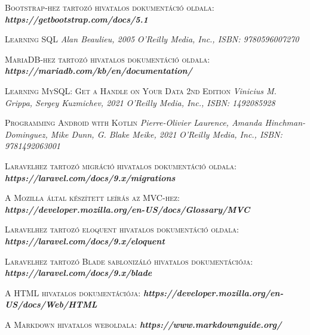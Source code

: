 \documentclass[
]{thesis-ekf}
\theoremstyle{definition}
\theoremstyle{remark}
\begin{document}
\begin{thebibliography}{2}
		\textsc{Bootstrap-hez tartozó hivatalos dokumentáció oldala:}
		\newline
		\emph{\bf{https://getbootstrap.com/docs/5.1}}
		
		\textsc{Learning SQL}
		\newline
		\emph{Alan Beaulieu, 2005}
		\emph{O'Reilly Media, Inc., ISBN: 9780596007270}
		
		\textsc{MariaDB-hez tartozó hivatalos dokumentáció oldala:}
		\newline
		\emph{\bf{https://mariadb.com/kb/en/documentation/}}
		
		\textsc{Learning MySQL: Get a Handle on Your Data 2nd Edition}
		\newline
		\emph{Vinicius M. Grippa, Sergey Kuzmichev,  2021}
		\emph{O'Reilly Media, Inc., ISBN: 1492085928}
		
		\textsc{Programming Android with Kotlin}
		\newline
		\emph{Pierre-Olivier Laurence, Amanda Hinchman-Dominguez, Mike Dunn, G. Blake Meike,  2021}
		\emph{O'Reilly Media, Inc., ISBN: 9781492063001}
		
		\textsc{Laravelhez tartozó migráció hivatalos dokumentáció oldala:}
		\newline
		\emph{\bf{https://laravel.com/docs/9.x/migrations}}
		
		\textsc{A Mozilla által készített leírás az MVC-hez:}
		\newline
		\emph{\bf{https://developer.mozilla.org/en-US/docs/Glossary/MVC}}
		
		\textsc{Laravelhez tartozó eloquent hivatalos dokumentáció oldala:}
		\newline
		\emph{\bf{https://laravel.com/docs/9.x/eloquent}}
		
		\textsc{Laravelhez tartozó Blade sablonizáló hivatalos dokumentációja:}
		\newline
		\emph{\bf{https://laravel.com/docs/9.x/blade}}
		
		\textsc{A HTML hivatalos dokumentációja:}
		\newline
		\emph{\bf{https://developer.mozilla.org/en-US/docs/Web/HTML}}
		
		\textsc{A Markdown hivatalos weboldala:}
		\newline
		\emph{\bf{https://www.markdownguide.org/}}
		

\end{thebibliography}
\end{document}
